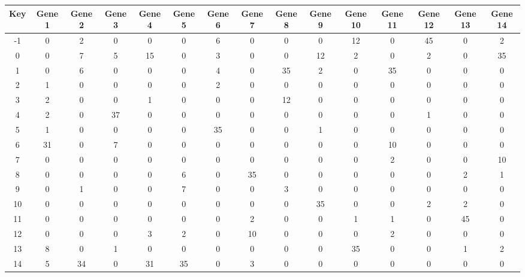 \begin{tabular}{|c|c|c|c|c|c|c|c|c|c|c|c|c|c|c|}
\hline
Key & Gene 1 & Gene 2 & Gene 3 & Gene 4 & Gene 5 & Gene 6 & Gene 7 & Gene 8 & Gene 9 & Gene 10 & Gene 11 & Gene 12 & Gene 13 & Gene 14 \\
\hline
-1 & 0 & 2 & 0 & 0 & 0 & 6 & 0 & 0 & 0 & 12 & 0 & 45 & 0 & 2 \\
0 & 0 & 7 & 5 & 15 & 0 & 3 & 0 & 0 & 12 & 2 & 0 & 2 & 0 & 35 \\
1 & 0 & 6 & 0 & 0 & 0 & 4 & 0 & 35 & 2 & 0 & 35 & 0 & 0 & 0 \\
2 & 1 & 0 & 0 & 0 & 0 & 2 & 0 & 0 & 0 & 0 & 0 & 0 & 0 & 0 \\
3 & 2 & 0 & 0 & 1 & 0 & 0 & 0 & 12 & 0 & 0 & 0 & 0 & 0 & 0 \\
4 & 2 & 0 & 37 & 0 & 0 & 0 & 0 & 0 & 0 & 0 & 0 & 1 & 0 & 0 \\
5 & 1 & 0 & 0 & 0 & 0 & 35 & 0 & 0 & 1 & 0 & 0 & 0 & 0 & 0 \\
6 & 31 & 0 & 7 & 0 & 0 & 0 & 0 & 0 & 0 & 0 & 10 & 0 & 0 & 0 \\
7 & 0 & 0 & 0 & 0 & 0 & 0 & 0 & 0 & 0 & 0 & 2 & 0 & 0 & 10 \\
8 & 0 & 0 & 0 & 0 & 6 & 0 & 35 & 0 & 0 & 0 & 0 & 0 & 2 & 1 \\
9 & 0 & 1 & 0 & 0 & 7 & 0 & 0 & 3 & 0 & 0 & 0 & 0 & 0 & 0 \\
10 & 0 & 0 & 0 & 0 & 0 & 0 & 0 & 0 & 35 & 0 & 0 & 2 & 2 & 0 \\
11 & 0 & 0 & 0 & 0 & 0 & 0 & 2 & 0 & 0 & 1 & 1 & 0 & 45 & 0 \\
12 & 0 & 0 & 0 & 3 & 2 & 0 & 10 & 0 & 0 & 0 & 2 & 0 & 0 & 0 \\
13 & 8 & 0 & 1 & 0 & 0 & 0 & 0 & 0 & 0 & 35 & 0 & 0 & 1 & 2 \\
14 & 5 & 34 & 0 & 31 & 35 & 0 & 3 & 0 & 0 & 0 & 0 & 0 & 0 & 0 \\
\hline
\end{tabular}